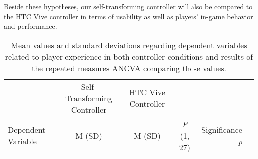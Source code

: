 \documentclass{sigchi}
\begin{document}

Beside these hypotheses, our self-transforming controller will also be compared to the HTC Vive controller in terms of usability as well as players' in-game behavior and performance.

\begin{table*}[]
  \caption{Mean values and standard deviations regarding dependent variables related to player experience in both controller conditions and results of the repeated measures ANOVA comparing those values.}
  \label{tab:means}
  \begin{tabular}{lcccrl}
    \toprule
    \addlinespace
     & Self-Transforming Controller & HTC Vive Controller \\
     \addlinespace 
     Dependent Variable & M (SD)	& M (SD)  & \textit{F} (1, 27) & 
     Significance
      \textit{p} \\   
       

\end{tabular}
\end{table*}
\end{document}
